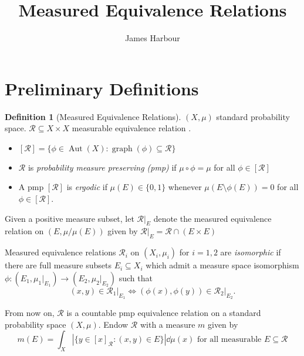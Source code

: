 \documentclass[12pt,letterpaper]{article}
\title{Measured Equivalence Relations}
\author{James Harbour}
\newcommand{\sub}{\subseteq}
\newcommand{\mc}[1]{\mathcal{#1}}
\DeclareMathOperator{\graph}{graph}
\DeclareMathOperator{\Aut}{Aut}
\theoremstyle{definition}
\newtheorem{definition}{Definition}[]
\theoremstyle{plain}
\theoremstyle{remark}
\begin{document}
\maketitle
\section{Preliminary Definitions}


\begin{definition}[Measured Equivalence Relations]
    $ (X,\mu) $ standard probability space. $ \mc{R}\sub X\times X $ measurable equivalence relation .
    \begin{itemize}
        \item $[\mc{R}] = \{\phi\in\Aut(X) : \graph(\phi)\sub \mc{R}\}$
        \item $ \mathcal{R} $ is \textit{probability measure preserving (pmp)} if $ \mu\circ \phi = \mu $ for all $ \phi\in[\mathcal{R}] $
        \item A pmp $ [\mathcal{R}] $ is \textit{ergodic} if $ \mu(E) \in\{0,1\} $ whenever $ \mu(E\setminus \phi(E)) = 0  $ for all $ \phi\in [\mathcal{R}] $.
    \end{itemize}

    Given a positive measure subset, let $ \mathcal{R}\vert_{E} $ denote the measured equivalence relation on $ (E,\mu/\mu(E)) $ given by $ \mathcal{R}\vert_{E} = \mathcal{R}\cap(E\times E) $ 

    Measured equivalence relations $ \mathcal{R}_{i} $ on $(X_{i},\mu_{i}) $ for $ i=1,2 $ are \textit{isomorphic} if there are full measure subsets $ E_{i}\sub X_{i} $ which admit a measure space isomorphism $ \phi:(E_{1},\mu_{1}\vert_{E_{1}})\to(E_{2},\mu_{2}\vert_{E_{2}}) $ such that
    \[
        (x,y) \in \mathcal{R}_{1}\vert_{E_{1}} \iff (\phi(x),\phi(y)) \in \mathcal{R}_{2}\vert_{E_{2}}.
    \]

    From now on, $ \mathcal{R} $ is a countable pmp equivalence relation on a standard probability space $ (X,\mu) $. Endow $ \mathcal{R} $ with a measure $ m $ given by 
    \[
        m(E) = \int_{X} |\{y\in [x]_{\mathcal{R}} : (x,y) \in E\}| \dd{\mu(x)} \text{ for all measurable } E\sub \mathcal{R}
    \]
    
\end{definition}
\end{document}
